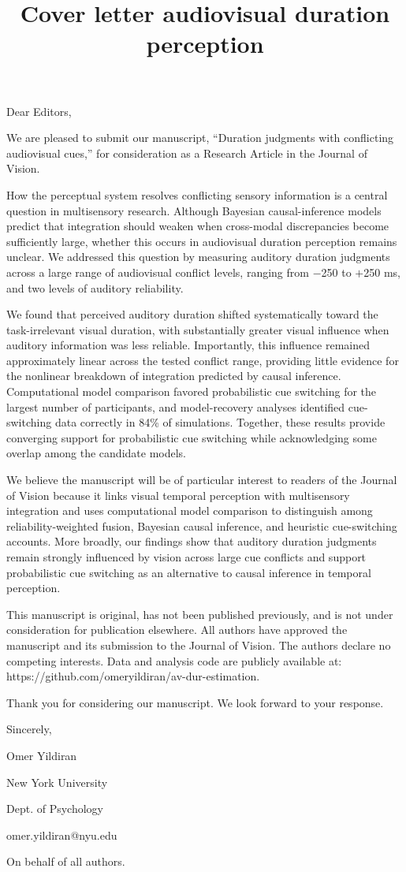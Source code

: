 \documentclass{article}
\title{Cover letter audiovisual duration perception}
\begin{document}
Dear Editors,

We are pleased to submit our manuscript, “Duration judgments with conflicting audiovisual cues,” for consideration as a Research Article in the Journal of Vision.

How the perceptual system resolves conflicting sensory information is a central question in multisensory research. Although Bayesian causal-inference models predict that integration should weaken when cross-modal discrepancies become sufficiently large, whether this occurs in audiovisual duration perception remains unclear. We addressed this question by measuring auditory duration judgments across a large range of audiovisual conflict levels, ranging from $-$250 to $+$250 ms, and two levels of auditory reliability.

We found that perceived auditory duration shifted systematically toward the task-irrelevant visual duration, with substantially greater visual influence when auditory information was less reliable. Importantly, this influence remained approximately linear across the tested conflict range, providing little evidence for the nonlinear breakdown of integration predicted by causal inference. Computational model comparison favored probabilistic cue switching for the largest number of participants, and model-recovery analyses identified cue-switching data correctly in 84\% of simulations. Together, these results provide converging support for probabilistic cue switching while acknowledging some overlap among the candidate models.


We believe the manuscript will be of particular interest to readers of the Journal of Vision because it links visual temporal perception with multisensory integration and uses computational model comparison to distinguish among reliability-weighted fusion, Bayesian causal inference, and heuristic cue-switching accounts. More broadly, our findings show that auditory duration judgments remain strongly influenced by vision across large cue conflicts and support probabilistic cue switching as an alternative to causal inference in temporal perception.


This manuscript is original, has not been published previously, and is not under consideration for publication elsewhere. All authors have approved the manuscript and its submission to the Journal of Vision. The authors declare no competing interests. Data and analysis code are publicly available at: https://github.com/omeryildiran/av-dur-estimation.


Thank you for considering our manuscript. We look forward to your response.

Sincerely,

Omer Yildiran

New York University

Dept. of Psychology

omer.yildiran@nyu.edu

On behalf of all authors.
\end{document}
